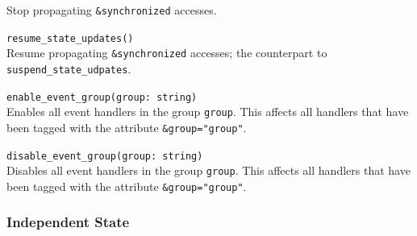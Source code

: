 \documentclass[10pt,landscape]{article}
\newcommand{\verbose}[1]{#1}
\newcommand{\verbose}[1]{}
\begin{document}
\begin{multicols*}{2}
\begin{itemize}
{    Stop propagating \verb|&synchronized| accesses.
  \item \verb|resume_state_updates()|\\
    Resume propagating \verb|&synchronized| accesses; the counterpart to
    \verb|suspend_state_udpates|.
  \item \verb|enable_event_group(group: string)|\\
    Enables all event handlers in the group \verb|group|. This affects all
    handlers that have been tagged with the attribute \verb|&group="group"|.
  \item \verb|disable_event_group(group: string)|\\
    Disables all event handlers in the group \verb|group|. This affects all
    handlers that have been tagged with the attribute \verb|&group="group"|.
}
\end{itemize}

\verbose{
\subsubsection*{Independent State}

}
\end{multicols*}
\end{document}
